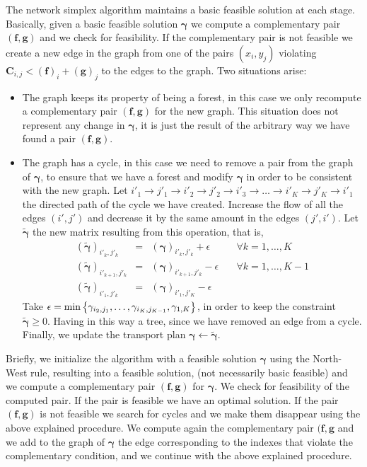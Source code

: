 The network simplex algorithm maintains a basic feasible solution at each stage. Basically, given a basic feasible solution $\pmb{\gamma}$ we compute a complementary pair $(\mathbf{f},\mathbf{g})$ and we check for feasibility. If the complementary pair is not feasible we create a new edge in the graph from one of the pairs $(x_i,y_j)$ violating $\mathbf{C}_{i,j}<(\mathbf{f})_i+(\mathbf{g})_j$ to the edges to the graph. Two situations arise:
\begin{itemize}
	\item The graph keeps its property of being a forest, in this case we only recompute a complementary pair $(\mathbf{f}, \mathbf{g})$ for the new graph. This situation does not represent any change in $\pmb{\gamma}$, it is just the result of the arbitrary way we have found a pair $(\mathbf{f}, \mathbf{g})$.
	\item The graph has a cycle, in this case we need to remove a pair from the graph of $\pmb{\gamma}$, to ensure that we have a forest and modify $\pmb{\gamma}$ in order to be consistent with the new graph. 
	Let $i'_1\to j'_1\to i'_2\to j'_2\to i'_3\to\dots\to i'_K\to j'_K\to i'_1$ the directed path of the cycle we have created. Increase the flow of all the edges $(i', j')$ and decrease it by the same amount in the edges $(j',i')$.
	Let $\tilde{\pmb{\gamma}}$ the new matrix resulting from this operation, that is,
	\begin{equation*}
		\begin{array}{lclc}
		(\tilde{\pmb{\gamma}})_{i'_k,j'_k}&=&({\pmb{\gamma}})_{i'_k,j'_k}+\epsilon&\quad \forall k=1,\dots, K\\
		(\tilde{\pmb{\gamma}})_{i'_{k+1}, j'_k}&=&({\pmb{\gamma}})_{i'_{k+1},j'_{k}}-\epsilon&\quad \forall k=1,\dots,K-1 \\
		(\tilde{\pmb{\gamma}})_{i'_1, j'_k}&=&({\pmb{\gamma}})_{i'_1,j'_{K}}-\epsilon&
		\end{array}
	\end{equation*}
	Take $\epsilon=\min\left\lbrace \gamma_{i_{2}, j_{1}},\dots, \gamma_{i_{K}, j_{K-1}},\gamma_{1,K} \right\rbrace$, in order to keep the constraint $\tilde{\pmb{\gamma}}\geq 0$. Having in this way a tree, since we have removed an edge from a cycle. Finally, we update the transport plan $\pmb{\gamma}\leftarrow\tilde{\pmb{\gamma}}$.
\end{itemize}
Briefly, we initialize the algorithm with a feasible solution $\pmb{\gamma}$ using the North-West rule, resulting into a feasible solution, (not necessarily basic feasible) and we compute a complementary pair $(\mathbf{f},\mathbf{g})$ for $\pmb{\gamma}$. We check for feasibility of the computed pair. If the pair is feasible we have an optimal solution. If the pair $(\mathbf{f},\mathbf{g})$ is not feasible we search for cycles and we make them disappear using the above explained procedure. We compute again the complementary pair $(\mathbf{f}, \mathbf{g}$  and we add to the graph of $\pmb{\gamma}$ the edge corresponding to the indexes that violate the complementary condition, and we continue with the above explained procedure. 

